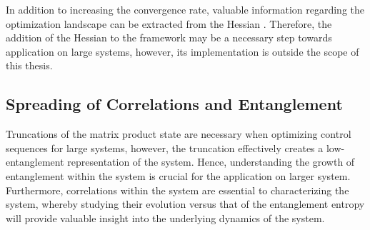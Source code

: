 In addition to increasing the convergence rate, valuable information regarding the optimization landscape can be extracted from the Hessian \cite{Shen2006}. Therefore, the addition of the Hessian to the framework may be a necessary step towards application on large systems, however, its implementation is outside the scope of this thesis.


\subsection{Spreading of Correlations and Entanglement}
Truncations of the matrix product state are necessary when optimizing control sequences for large systems, however, the truncation effectively creates a low-entanglement representation of the system. Hence, understanding the growth of entanglement within the system is crucial for the application on larger system. Furthermore, correlations within the system are essential to characterizing the system, whereby studying their evolution versus that of the entanglement entropy will provide valuable insight into the underlying dynamics of the system.

